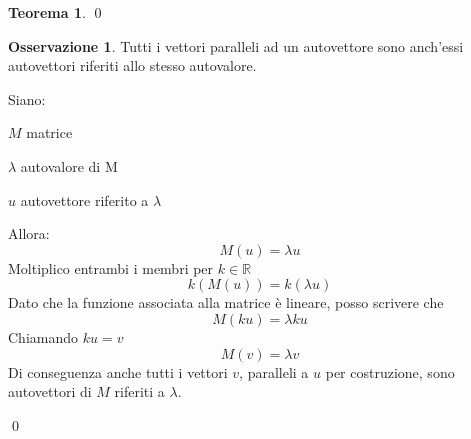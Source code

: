 \documentclass[10pt,a4paper]{article}
\theoremstyle{plain}
\theoremstyle{definition}
\newtheorem{teorema}[subsection]{Teorema}
\newtheorem{osservazione}[subsection]{Osservazione}
\begin{document}
\begin{teorema}
\qed
\end{teorema}
\newpage
\begin{osservazione}
	Tutti i vettori paralleli ad un autovettore sono anch'essi autovettori riferiti allo stesso autovalore.
\end{osservazione}
\proof
	\[\]
	 Siano:
	
	$M$ matrice
	
	$\lambda$ autovalore di M
	
	${u}$ autovettore riferito a $\lambda$
	
	Allora:
	\[
	M({u})=\lambda{u}
	\]
	Moltiplico entrambi i membri per $k\in\mathbb{R}$
	\[
	k(M({u}))=k(\lambda{u})
	\]
	Dato che la funzione associata alla matrice è lineare, posso scrivere che
	\[
	M(k{u})=\lambda k{u}
	\]
	Chiamando $k{u}={v}$
	\[
	M({v})=\lambda{v}
	\]
	Di conseguenza anche tutti i vettori ${v}$, paralleli a ${u}$ per costruzione, sono autovettori di $M$ riferiti a $\lambda$.
	 
	\qed
\end{document}
